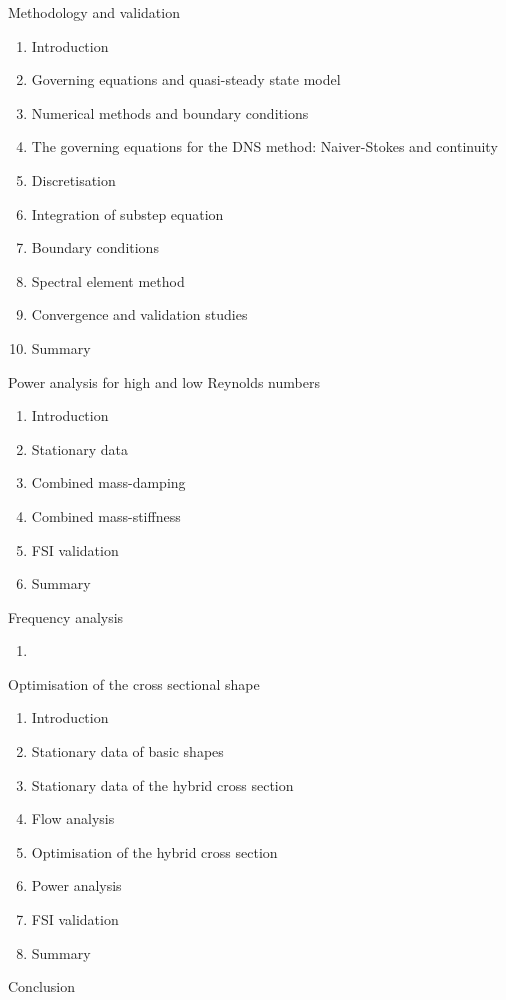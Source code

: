 \documentclass{article}
\begin{document}
\item Methodology and validation
\begin{enumerate}[i]
\item Introduction
\item Governing equations and quasi-steady state model 
\item Numerical methods and boundary conditions 
\item The governing equations for the DNS method: Naiver-Stokes and continuity  
\item Discretisation  
\item Integration of substep equation 
\item Boundary conditions 
\item Spectral element method
\item Convergence and validation studies 
\item Summary
\end{enumerate}
\item Power analysis for high and low Reynolds numbers
\begin{enumerate}[i]
\item Introduction 
\item Stationary data 
\item Combined mass-damping 	 
\item Combined mass-stiffness 
\item FSI validation 
\item Summary 
\end{enumerate}

\item Frequency analysis 
\begin{enumerate}[i]
\item 
\end{enumerate}

\item Optimisation of the cross sectional shape 
\begin{enumerate}[i]
\item Introduction 
\item Stationary data of basic shapes  
\item Stationary data of the hybrid cross section
\item Flow analysis  
\item Optimisation of the hybrid cross section 
\item Power analysis 
\item FSI validation
\item Summary 
\end{enumerate}

\item Conclusion
\end{document}
